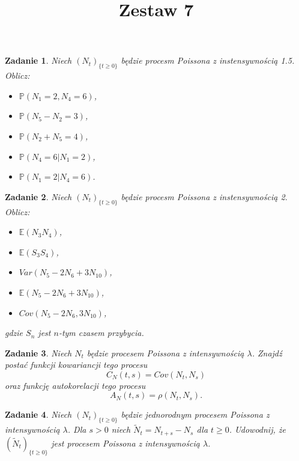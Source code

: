 \documentclass{mwart}
\title{Zestaw 7}
\newtheorem{zd}{Zadanie}
\begin{document}

\maketitle

\begin{zd}
Niech $(N_t)_{\{t \geq 0\}}$ będzie procesm Poissona z instensywnością 1.5. Oblicz:
\begin{itemize}
\item $\mathbb{P}(N_1=2, N_4=6)$,
\item $\mathbb{P}(N_5-N_2 = 3)$,
\item $\mathbb{P}(N_2+N_5=4)$,
\item $\mathbb{P}(N_4=6| N_1=2)$,
\item$\mathbb{P}(N_1=2| N_4=6)$.
\end{itemize}
\end{zd}

\begin{zd}
Niech $(N_t)_{\{t \geq 0\}}$ będzie procesm Poissona z instensywnością 2. Oblicz:
\begin{itemize}
\item $\mathbb{E}(N_3N_4)$,
\item $\mathbb{E}(S_3S_4)$,
\item $Var(N_5-2N_6+3N_{10})$,
\item $\mathbb{E}(N_5-2N_6+3N_{10})$,
\item $Cov(N_5-2N_6, 3N_{10})$,
\end{itemize}
gdzie $S_n$ jest $n$-tym czasem przybycia.
\end{zd}

\begin{zd}
Niech $N_t$ będzie procesem Poissona z intensywnością $\lambda$. Znajdź postać funkcji kowariancji tego procesu
\begin{displaymath}
C_N(t,s) = Cov(N_t, N_s)
\end{displaymath}
oraz funkcję autokorelacji tego procesu
\begin{displaymath}
	A_N(t,s) = \rho\left(N_t, N_s\right).
\end{displaymath}
\end{zd}

\begin{zd}
Niech $(N_t)_{\{t \geq 0\}}$ będzie jednorodnym procesem Poissona z intensywnością $\lambda$. Dla $s > 0$ niech $\tilde{N}_t = N_{t+s} - N_s$ dla $t\geq 0$. Udowodnij, że $(\tilde{N}_t)_{\{t \geq 0\}}$ jest procesem Poissona z intensywnością $\lambda$.
\end{zd}
\end{document}
